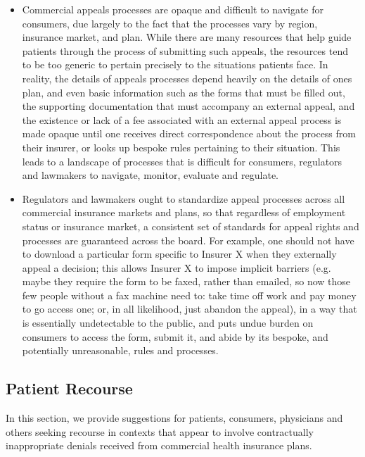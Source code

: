 \documentclass[12pt, a4paper,twoside,parskip=full]{report}
\theoremstyle{plain} %
\theoremstyle{definition} %
\theoremstyle{remark} %
\numberwithin{equation}{chapter}
\begin{document}
		\begin{itemize}
			\item Commercial appeals processes are opaque and difficult to navigate for consumers, due largely to the fact that 
			the processes vary by region, insurance market, and plan. While there are many resources that help guide 
			patients through the process of submitting such appeals, the resources tend to be too generic to pertain 
			precisely to the situations patients face. In reality, the details of appeals processes depend heavily on 
			the details of ones plan, and even basic information such as the forms that must be filled out, the supporting 
			documentation that must accompany an external appeal, and the existence or lack of a fee associated with an external 
			appeal process is made opaque until one receives direct correspondence about the process from their insurer, or looks 
			up bespoke rules pertaining to their situation. This leads to a landscape of processes that is difficult for 
			consumers, regulators and lawmakers to navigate, monitor, evaluate and regulate.
			
			\item Regulators and lawmakers ought to standardize appeal processes across all commercial insurance markets and plans, 
			so that regardless of employment status or insurance market, a consistent set of standards for appeal rights and 
			processes are guaranteed across the board. For example, one should not have to download a particular form specific 
			to Insurer X when they externally appeal a decision; this allows Insurer X to impose implicit barriers (e.g. maybe 
			they require the form to be faxed, rather than emailed, so now those few people without a fax machine need to: take 
			time off work and pay money to go access one; or, in all likelihood, just abandon the appeal), in a way that is essentially undetectable to the public, and puts 
			undue burden on consumers to access the form, submit it, and abide by its bespoke, and potentially unreasonable, 
			rules and processes.
		\end{itemize}
		
		\subsection{Patient Recourse}
		
		In this section, we provide suggestions for patients, consumers, physicians and others seeking recourse in
		contexts that appear to involve contractually inappropriate denials received from commercial health insurance plans.
		
\end{document}
